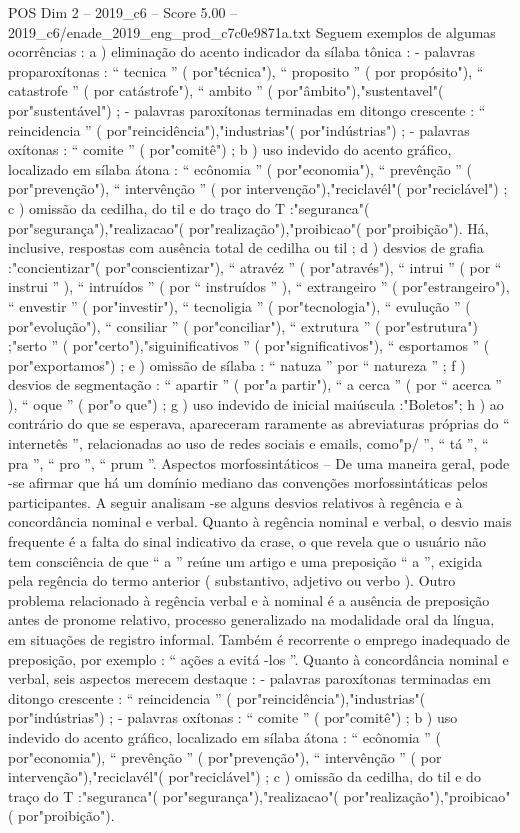 \begin{textsample}{POS Dim 2 – 2019\_c6 – Score 5.00 – 2019\_c6/enade\_2019\_eng\_prod\_c7c0e9871a.txt}
Seguem exemplos de algumas ocorrências : a ) eliminação do acento indicador da sílaba tônica : - palavras proparoxítonas : “ tecnica ” ( por"técnica"), “ proposito ” ( por propósito"), “ catastrofe ” ( por catástrofe"), “ ambito ” ( por"âmbito"),"sustentavel"( por"sustentável") ; - palavras paroxítonas terminadas em ditongo crescente : “ reincidencia ” ( por"reincidência"),"industrias"( por"indústrias") ; - palavras oxítonas : “ comite ” ( por"comitê") ; b ) uso indevido do acento gráfico, localizado em sílaba átona : “ ecônomia ” ( por"economia"), “ prevênção ” ( por"prevenção"), “ intervênção ” ( por intervenção"),"reciclavél"( por"reciclável") ; c ) omissão da cedilha, do til e do traço do T :"seguranca"( por"segurança"),"realizacao"( por"realização"),"proibicao"( por"proibição").
Há, inclusive, respostas com ausência total de cedilha ou til ; d ) desvios de grafia :"concientizar"( por"conscientizar"), “ atravéz ” ( por"através"), “ intrui ” ( por “ instrui ” ), “ intruídos ” ( por “ instruídos ” ), “ extrangeiro ” ( por"estrangeiro"), “ envestir ” ( por"investir"), “ tecnoligia ” ( por"tecnologia"), “ evulução ” ( por"evolução"), “ consiliar ” ( por"conciliar"), “ extrutura ” ( por"estrutura") ;"serto ” ( por"certo"),"siguinificativos ” ( por"significativos"), “ esportamos ” ( por"exportamos") ; e ) omissão de sílaba : “ natuza ” por “ natureza ” ; f ) desvios de segmentação : “ apartir ” ( por"a partir"), “ a cerca ” ( por “ acerca ” ), “ oque ” ( por"o que") ; g ) uso indevido de inicial maiúscula :"Boletos"; h ) ao contrário do que se esperava, apareceram raramente as abreviaturas próprias do “ internetês ”, relacionadas ao uso de redes sociais e emails, como"p/ ”, “ tá ”, “ pra ”, “ pro ”, “ prum ”.
Aspectos morfossintáticos – De uma maneira geral, pode -se afirmar que há um domínio mediano das convenções morfossintáticas pelos participantes.
A seguir analisam -se alguns desvios relativos à regência e à concordância nominal e verbal.
Quanto à regência nominal e verbal, o desvio mais frequente é a falta do sinal indicativo da crase, o que revela que o usuário não tem consciência de que “ a ” reúne um artigo e uma preposição “ a ”, exigida pela regência do termo anterior ( substantivo, adjetivo ou verbo ).
Outro problema relacionado à regência verbal e à nominal é a ausência de preposição antes de pronome relativo, processo generalizado na modalidade oral da língua, em situações de registro informal.
Também é recorrente o emprego inadequado de preposição, por exemplo : “ ações a evitá -los ”.
Quanto à concordância nominal e verbal, seis aspectos merecem destaque : - palavras paroxítonas terminadas em ditongo crescente : “ reincidencia ” ( por"reincidência"),"industrias"( por"indústrias") ; - palavras oxítonas : “ comite ” ( por"comitê") ; b ) uso indevido do acento gráfico, localizado em sílaba átona : “ ecônomia ” ( por"economia"), “ prevênção ” ( por"prevenção"), “ intervênção ” ( por intervenção"),"reciclavél"( por"reciclável") ; c ) omissão da cedilha, do til e do traço do T :"seguranca"( por"segurança"),"realizacao"( por"realização"),"proibicao"( por"proibição").

\end{textsample}
